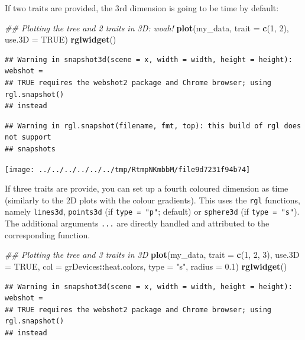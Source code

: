 \documentclass[
]{book}
\newenvironment{Shaded}{\begin{snugshade}}{\end{snugshade}}
\newcommand{\CommentTok}[1]{\textcolor[rgb]{0.56,0.35,0.01}{\textit{#1}}}
\newcommand{\DataTypeTok}[1]{\textcolor[rgb]{0.13,0.29,0.53}{#1}}
\newcommand{\DecValTok}[1]{\textcolor[rgb]{0.00,0.00,0.81}{#1}}
\newcommand{\FloatTok}[1]{\textcolor[rgb]{0.00,0.00,0.81}{#1}}
\newcommand{\KeywordTok}[1]{\textcolor[rgb]{0.13,0.29,0.53}{\textbf{#1}}}
\newcommand{\NormalTok}[1]{#1}
\newcommand{\OperatorTok}[1]{\textcolor[rgb]{0.81,0.36,0.00}{\textbf{#1}}}
\newcommand{\OtherTok}[1]{\textcolor[rgb]{0.56,0.35,0.01}{#1}}
\newcommand{\StringTok}[1]{\textcolor[rgb]{0.31,0.60,0.02}{#1}}
\begin{document}
If two traits are provided, the 3rd dimension is going to be time by default:

\begin{Shaded}
\begin{Highlighting}[]
\CommentTok{\#\# Plotting the tree and 2 traits in 3D: woah!}
\KeywordTok{plot}\NormalTok{(my\_data, }\DataTypeTok{trait =} \KeywordTok{c}\NormalTok{(}\DecValTok{1}\NormalTok{, }\DecValTok{2}\NormalTok{), }\DataTypeTok{use.3D =} \OtherTok{TRUE}\NormalTok{)}
\KeywordTok{rglwidget}\NormalTok{()}
\end{Highlighting}
\end{Shaded}

\begin{verbatim}
## Warning in snapshot3d(scene = x, width = width, height = height): webshot =
## TRUE requires the webshot2 package and Chrome browser; using rgl.snapshot()
## instead
\end{verbatim}

\begin{verbatim}
## Warning in rgl.snapshot(filename, fmt, top): this build of rgl does not support
## snapshots
\end{verbatim}

\texttt{[image: ../../../../../../tmp/RtmpNKmbbM/file9d7231f94b74]}

If three traits are provide, you can set up a fourth coloured dimension as time (similarly to the 2D plots with the colour gradients).
This uses the \texttt{rgl} functions, namely \texttt{lines3d}, \texttt{points3d} (if \texttt{type\ =\ "p"}; default) or \texttt{sphere3d} (if \texttt{type\ =\ "s"}).
The additional arguments \texttt{...} are directly handled and attributed to the corresponding function.

\begin{Shaded}
\begin{Highlighting}[]
\CommentTok{\#\# Plotting the tree and 3 traits in 3D}
\KeywordTok{plot}\NormalTok{(my\_data, }\DataTypeTok{trait =} \KeywordTok{c}\NormalTok{(}\DecValTok{1}\NormalTok{, }\DecValTok{2}\NormalTok{, }\DecValTok{3}\NormalTok{), }\DataTypeTok{use.3D =} \OtherTok{TRUE}\NormalTok{,}
     \DataTypeTok{col =}\NormalTok{ grDevices}\OperatorTok{::}\NormalTok{heat.colors, }\DataTypeTok{type =} \StringTok{"s"}\NormalTok{, }\DataTypeTok{radius =} \FloatTok{0.1}\NormalTok{)}
\KeywordTok{rglwidget}\NormalTok{()}
\end{Highlighting}
\end{Shaded}

\begin{verbatim}
## Warning in snapshot3d(scene = x, width = width, height = height): webshot =
## TRUE requires the webshot2 package and Chrome browser; using rgl.snapshot()
## instead
\end{verbatim}
\end{document}
